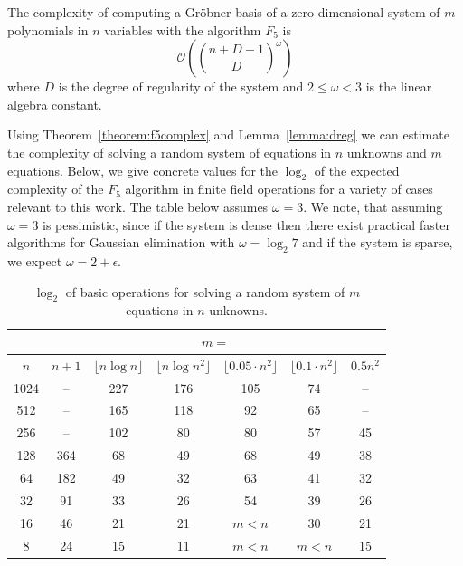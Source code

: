 \documentclass{llncs}
\newcommand{\ord}[1]{\ensuremath{\mathcal{O}\!\left(#1\right)}}
\begin{document}
\begin{theorem}
\label{theorem:f5complex} The complexity of computing a Gr\"{o}bner basis of a zero-dimensional system of $m$ polynomials in $n$ variables with the algorithm $F_5$ is
\[
 \ord{ {{{n + D -1} \choose D}}^\omega }
\]
where $D$ is the degree of regularity of the system and $2 \leq \omega < 3$ is the linear algebra constant.
\end{theorem}

Using Theorem~\ref{theorem:f5complex} and Lemma~\ref{lemma:dreg} we can estimate the complexity of solving a random system of equations in $n$ unknowns and $m$ equations. Below, we give concrete values for the $\log_2$ of the expected complexity of the $F_5$ algorithm in finite field operations for a variety of cases relevant to this work. The table below assumes $\omega = 3$. We note, that assuming $\omega = 3$ is pessimistic, since if the system is dense then there exist practical faster algorithms for Gaussian elimination with $\omega = \log_2 7$ and if the system is sparse, we expect $\omega = 2 + \epsilon$.

\begin{table}
\begin{center}
\begin{tabular}{|c|c|c|c|c|c|c|}
\hline
     & \multicolumn{6}{c|}{$m=$}\\
\hline
 $n$ & $n + 1$ & $\lfloor n \log n\rfloor$  & $\lfloor n \log n^2\rfloor$ & $\lfloor 0.05 \cdot n^2 \rfloor$ & $\lfloor 0.1 \cdot n^2 \rfloor$ & $0.5 n^2$\\
\hline
1024 &  -- &  227 & 176 &  105 & 74 & --\\
 512 &  -- &  165 & 118 &   92 & 65 & --\\
 256 &  -- &  102 &  80 &   80 & 57 & 45\\
 128 & 364 &   68 &  49 &   68 & 49 & 38\\
  64 & 182 &   49 &  32 &   63 & 41 & 32\\
  32 &  91 &   33 &  26 &   54 & 39 & 26\\
  16 &  46 &   21 &  21 &   $m<n$ & 30 & 21\\
   8 &  24 &   15 &  11 &   $m<n$ & $m<n$ & 15\\
\hline
\end{tabular}
\end{center}
\caption{$\log_2$ of basic operations for solving a random system of $m$ equations in $n$ unknowns.}\label{table-eqnsolving}
\end{table}
\end{document}
